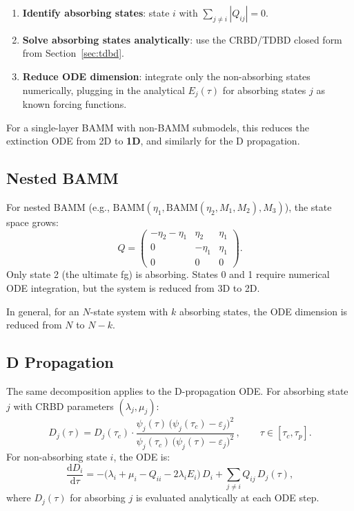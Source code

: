\documentclass[11pt,a4paper]{article}
\newcommand{\dd}{\mathrm{d}}
\newcommand{\eps}{\varepsilon}
\theoremstyle{plain}
\theoremstyle{definition}
\theoremstyle{remark}
\begin{document}
\begin{enumerate}[nosep]
  \item \textbf{Identify absorbing states}: state $i$ with $\sum_{j\neq i} |Q_{ij}| = 0$.
  \item \textbf{Solve absorbing states analytically}: use the CRBD/TDBD closed form from Section~\ref{sec:tdbd}.
  \item \textbf{Reduce ODE dimension}: integrate only the non-absorbing states numerically, plugging in the analytical $E_j(\tau)$ for absorbing states $j$ as known forcing functions.
\end{enumerate}

For a single-layer BAMM with non-BAMM submodels, this reduces the extinction ODE from 2D to \textbf{1D}, and similarly for the D propagation.

\subsection{Nested BAMM}

For nested BAMM (e.g., $\text{BAMM}(\eta_1, \text{BAMM}(\eta_2, M_1, M_2), M_3)$), the state space grows:
\[
  Q = \begin{pmatrix}
    -\eta_2 - \eta_1 & \eta_2 & \eta_1 \\
    0 & -\eta_1 & \eta_1 \\
    0 & 0 & 0
  \end{pmatrix}.
\]
Only state 2 (the ultimate fg) is absorbing.
States 0 and 1 require numerical ODE integration, but the system is reduced from 3D to 2D.

In general, for an $N$-state system with $k$ absorbing states, the ODE dimension is reduced from $N$ to $N - k$.

\subsection{D Propagation}

The same decomposition applies to the D-propagation ODE.
For absorbing state $j$ with CRBD parameters $(\lambda_j, \mu_j)$:
\[
  D_j(\tau) = D_j(\tau_c) \cdot \frac{\psi_j(\tau)\,\bigl(\psi_j(\tau_c) - \eps_j\bigr)^2}{\psi_j(\tau_c)\,\bigl(\psi_j(\tau) - \eps_j\bigr)^2}\,,
  \qquad \tau \in [\tau_c, \tau_p].
\]
For non-absorbing state $i$, the ODE is:
\[
  \frac{\dd D_i}{\dd\tau} = -\bigl(\lambda_i + \mu_i - Q_{ii} - 2\lambda_i E_i\bigr)\,D_i + \sum_{j \neq i} Q_{ij}\,D_j(\tau),
\]
where $D_j(\tau)$ for absorbing $j$ is evaluated analytically at each ODE step.
\end{document}
